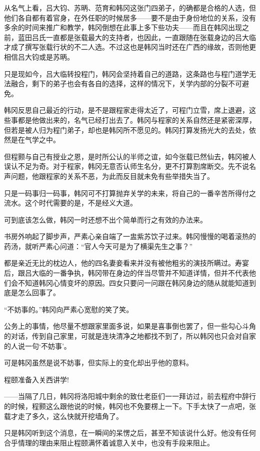 从名气上看，吕大钧、苏昞、范育和韩冈这张门四弟子，的确都是合格的人选，但他们各自都有着官身，在外任职的时候居多——要不是由于身份地位的关系，没有多余的时间来推广和教学，韩冈倒想在此事上多下些功夫——而且在韩冈出现之前，蓝田吕氏一直都是张载最大的支持者，也因此，一直跟随在张载身边的吕大临才成了撰写张载行状的不二人选。不过这也是韩冈当时还在广西的缘故，否则他更相信吕大钧或是苏昞。

只是现如今，吕大临转投程门，韩冈会坚持着自己的道路，这条路也与程门道学无法融合，剩下的弟子也会有各自的选择，这样的情况下，关学内部的分裂不可避免。

韩冈反思自己最近的行动，是不是跟程家走得太近了，可程门立雪，席上退避，这些事都是他做出来的，名气已经打出去了。韩冈与程家的关系自然还是紧密深厚，但若是被人归为程门弟子，却也是韩冈所不愿见的。韩冈打算发扬光大的去处，依然是在气学之中。

但程颢与自己有授业之恩，是时所公认的半师之谊，如今张载已然仙去，韩冈被人误认不足为奇。对于程家，韩冈无意否认师生名分，更不打算割席断交。先不说名声问题，他跟程家的关系不恶，为此而反目就未免有些举措失当了。

只是一码事归一码事，韩冈可不打算抛弃关学的未来，将自己的一番辛苦所得付之流水。这个时代需要的是，不是经义大道。

可到底该怎么做，韩冈一时还想不出个简单而行之有效的办法来。

书房外响起了脚步声，严素心亲自端了一盅紫苏饮子过来。韩冈慢慢的喝着滚热的药汤，就听严素心问道：“官人今天可是为了横渠先生之事？”

都是亲近无比的枕边人，他的四名妻妾看来并没有被他粗劣的演技所瞒过。寿宴后，跟吕大临的一番争执，韩冈带在身边的伴当尽管并不知道详情，但并不代表他们会不知道韩冈心情变坏的原因。四女只要问一问跟在韩冈身边的随从就能知道到底是怎么回事了。

“不妨事的。”韩冈向严素心宽慰的笑了笑。

公务上的事情，他尽量不想跟家里面多说，如果是喜事倒也罢了，但一些勾心斗角的对话，传到自己家里，可就是连块清净之地都找不到了，所以韩冈也只会对自家的人说一句‘不妨事’。

可是韩冈虽然是说不妨事，但实际上的变化却出乎他的意料。

程颐准备入关西讲学!

——当隔了几日，韩冈将洛阳城中剩余的致仕老臣们一一拜访过，前去程府中辞行的时候，程颢这么跟他说的时候，韩冈也不免要楞上一下。下手太快了一点吧，张载才走了多久，这么快就开挖墙角了。

只是韩冈听到这个消息，在一瞬间的呆愣之后，甚至不知该说什么好。他没有任何合乎情理的理由来阻止程颐满怀着诚意入关中，也没有手段来阻止。

